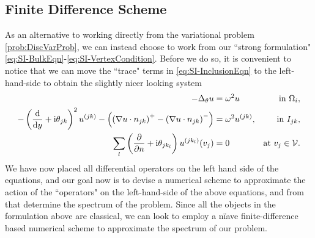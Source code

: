 \subsection{Finite Difference Scheme} \label{ssec:FDMSingInc}
As an alternative to working directly from the variational problem \ref{prob:DiscVarProb}, we can instead choose to work from our ``strong formulation" \eqref{eq:SI-BulkEqn}-\eqref{eq:SI-VertexCondition}.
Before we do so, it is convenient to notice that we can move the ``trace" terms in \eqref{eq:SI-InclusionEqn} to the left-hand-side to obtain the slightly nicer looking system
\begin{align*}
	-\Delta_\theta u 
	&= \omega^2 u 
	&\text{in } \Omega_i, \\
	- \left( \dfrac{\mathrm{d}}{\mathrm{d}y} + \mathrm{i}\theta_{jk} \right)^2u^{(jk)}  - \left( \left( \nabla u\cdot n_{jk} \right)^+ - \left( \nabla u\cdot n_{jk} \right)^- \right)
	&= \omega^2 u^{(jk)},
	&\text{in } I_{jk}, \\
	\sum_l \left( \dfrac{\partial }{\partial n}+\mathrm{i}\theta_{jk_l} \right) u^{(jk_l)}(v_j) 
	&= 0 
	&\text{at } v_j\in\mathcal{V}.
\end{align*}
We have now placed all differential operators on the left hand side of the equations, and our goal now is to devise a numerical scheme to approximate the action of the ``operators" on the left-hand-side of the above equations, and from that determine the spectrum of the problem.
Since all the objects in the formulation above are classical, we can look to employ a n{\"i}ave finite-difference based numerical scheme to approximate the spectrum of our problem.

